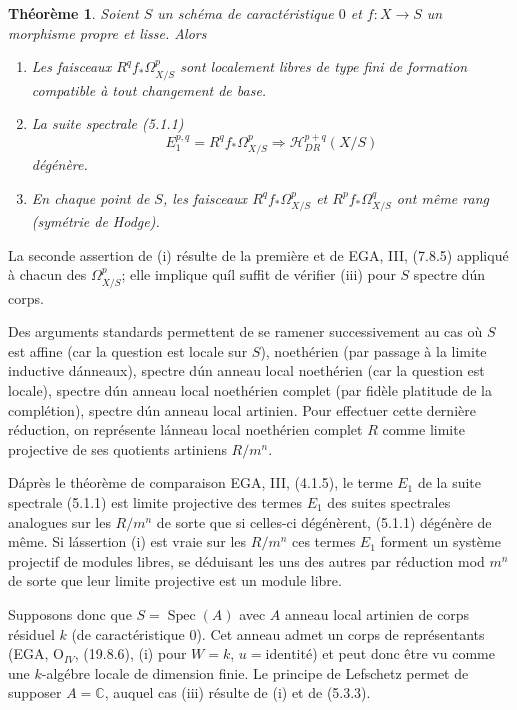 \documentclass[12pt]{amsart}
\theoremstyle{plain}
\newtheorem{thm}[prop]{Th\'eor\`eme}
\theoremstyle{remark}
\DeclareMathOperator{\Spec}{Spec}
\newcommand{\cH}{\mathscr{H}}
\begin{document}
\begin{thm}\label{thm:5.5}
Soient $S$ un sch\'ema de caract\'eristique $0$ et $f : X \to S$ un morphisme propre et lisse. Alors
\begin{enumerate}
\item[(i)] Les faisceaux $R^q f_* \Omega_{X/S}^p$ sont localement libres de type fini de formation compatible \`a tout changement de base.
\item[(ii)] La suite spectrale (5.1.1)
\[
E_1^{p,q} = R^q f_* \Omega_{X/S}^p \Rightarrow \cH_{DR}^{p+q}(X/S)
\]
d\'eg\'en\`ere.
\item[(iii)] En chaque point de $S$, les faisceaux $R^q f_* \Omega_{X/S}^p$ et $R^p f_* \Omega_{X/S}^q$ ont m\^eme rang (sym\'etrie de Hodge).
\end{enumerate}
\end{thm}

La seconde assertion de (i) r\'esulte de la premi\`ere et de EGA, III, (7.8.5) appliqu\'e \`a chacun des $\Omega_{X/S}^p$; elle implique qu\'il suffit de v\'erifier (iii) pour $S$ spectre d\'un corps.

Des arguments standards permettent de se ramener successivement au cas o\`u $S$ est affine (car la question est locale sur $S$), noeth\'erien (par passage \`a la limite inductive d\'anneaux), spectre d\'un anneau local noeth\'erien (car la question est locale), spectre d\'un anneau local noeth\'erien complet (par fid\`ele platitude de la compl\'etion), spectre d\'un anneau local artinien. Pour effectuer cette derni\`ere r\'eduction, on repr\'esente l\'anneau local noeth\'erien complet $R$ comme limite projective de ses quotients artiniens $R/m^n$.

D\'apr\`es le th\'eor\`eme de comparaison EGA, III, (4.1.5), le terme $E_1$ de la suite spectrale (5.1.1) est limite projective des termes $E_1$ des suites spectrales analogues sur les $R/m^n$ de sorte que si celles-ci d\'eg\'en\`erent, (5.1.1) d\'eg\'en\`ere de m\^eme. Si l\'assertion (i) est vraie sur les $R/m^n$ ces termes $E_1$ forment un syst\`eme projectif de modules libres, se d\'eduisant les uns des autres par r\'eduction mod $m^n$ de sorte que leur limite projective est un module libre.

Supposons donc que $S = \Spec(A)$ avec $A$ anneau local artinien de corps r\'esiduel $k$ (de caract\'eristique $0$). Cet anneau admet un corps de repr\'esentants (EGA, O$_{IV}$, (19.8.6), (i) pour $W = k$, $u = \text{identit\'e}$) et peut donc \^etre vu comme une $k$-alg\'ebre locale de dimension finie. Le principe de Lefschetz permet de supposer $A = \mathbb{C}$, auquel cas (iii) r\'esulte de (i) et de (5.3.3).
\end{document}
